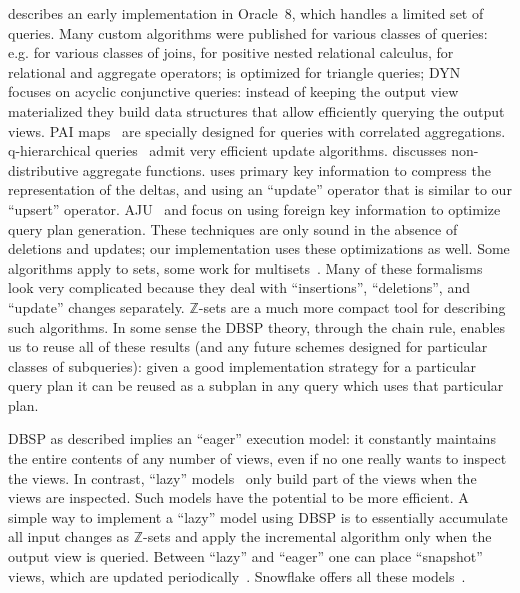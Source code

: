 \documentclass[twocolumn
]{svjour3}
\numberwithin{equation}{section}
\newcommand{\dbsp}{DBSP\xspace}
\newcommand{\zrs}{$\Z$-sets\xspace} %
\newcommand{\Z}{\mathbb{Z}}  %
\begin{document}
\cite{bello-vldb98} describes an early implementation in Oracle~8,
which handles a limited set of queries.  Many custom algorithms were
published for various classes of queries:
e.g. \cite{griffin-sigmod98,larson-icde07} for various classes of
joins, \cite{koch-pods16} for positive nested relational calculus,
\cite{gupta-infsys06} for relational and aggregate operators;
\cite{kara-tds20} is optimized for triangle queries;
DYN~\cite{idris-sigmod17,idris-vldb18,idris-sigmod19} focuses on
acyclic conjunctive queries: instead of keeping the output view
materialized they build data structures that allow efficiently
querying the output views.  PAI maps~\cite{abeysinghe-sigmod22} are
specially designed for queries with correlated aggregations.
q-hierarchical que\-ries~\cite{berkholz-pods17} admit very efficient
update algorithms.  \cite{palpanas-vldb02} discusses non-distributive
aggregate functions.  \cite{katsis-sigmod15} uses primary key
information to compress the representation of the deltas, and using an
``update'' operator that is similar to our ``upsert'' operator.
AJU~\cite{wang-sigmod20} and \cite{svingos-amd23} focus on using
foreign key information to optimize query plan generation.  These
techniques are only sound in the absence of deletions and updates; our
implementation uses these optimizations as well.  Some algorithms
apply to sets, some work for multisets~\cite{griffin-sigmod95}.  Many
of these formalisms look very complicated because they deal with
``insertions'', ``deletions'', and ``update'' changes separately.
\zrs are a much more compact tool for describing such algorithms.  In
some sense the \dbsp theory, through the chain rule, enables us to
reuse all of these results (and any future schemes designed for
particular classes of subqueries): given a good implementation
strategy for a particular query plan it can be reused as a subplan in
any query which uses that particular plan.

\dbsp as described implies an ``eager'' execution model: it constantly
maintains the entire contents of any number of views, even if no one
really wants to inspect the views.  In contrast, ``lazy''
models~\cite{hanson-sigmod87} only build part of the views when the
views are inspected.  Such models have the potential to be more
efficient.  A simple way to implement a ``lazy'' model using \dbsp is
to essentially accumulate all input changes as \zrs and apply the
incremental algorithm only when the output view is queried.  Between
``lazy'' and ``eager'' one can place ``snapshot'' views, which are
updated periodically~\cite{colby-sigmod97}.  Snowflake offers all
these models~\cite{akidau-amd23}.
\end{document}
